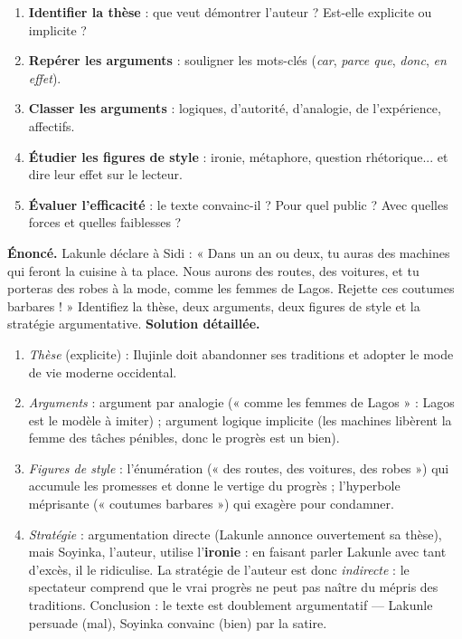 \documentclass[11pt]{article}
\begin{document}
\begin{methode}
\begin{enumerate}
\item \textbf{Identifier la thèse} : que veut démontrer l'auteur ? Est-elle explicite ou implicite ?
\item \textbf{Repérer les arguments} : souligner les mots-clés (\emph{car}, \emph{parce que}, \emph{donc}, \emph{en effet}).
\item \textbf{Classer les arguments} : logiques, d'autorité, d'analogie, de l'expérience, affectifs.
\item \textbf{Étudier les figures de style} : ironie, métaphore, question rhétorique... et dire leur effet sur le lecteur.
\item \textbf{Évaluer l'efficacité} : le texte convainc-il ? Pour quel public ? Avec quelles forces et quelles faiblesses ?
\end{enumerate}
\end{methode}

\begin{exoresolu}
\textbf{Énoncé.} Lakunle déclare à Sidi : « Dans un an ou deux, tu auras des machines qui feront la cuisine à ta place. Nous aurons des routes, des voitures, et tu porteras des robes à la mode, comme les femmes de Lagos. Rejette ces coutumes barbares ! » Identifiez la thèse, deux arguments, deux figures de style et la stratégie argumentative.
\tcblower
\textbf{Solution détaillée.}
\begin{enumerate}
\item \emph{Thèse} (explicite) : Ilujinle doit abandonner ses traditions et adopter le mode de vie moderne occidental.
\item \emph{Arguments} : argument par analogie (« comme les femmes de Lagos » : Lagos est le modèle à imiter) ; argument logique implicite (les machines libèrent la femme des tâches pénibles, donc le progrès est un bien).
\item \emph{Figures de style} : l'énumération (« des routes, des voitures, des robes ») qui accumule les promesses et donne le vertige du progrès ; l'hyperbole méprisante (« coutumes barbares ») qui exagère pour condamner.
\item \emph{Stratégie} : argumentation directe (Lakunle annonce ouvertement sa thèse), mais Soyinka, l'auteur, utilise l'\textbf{ironie} : en faisant parler Lakunle avec tant d'excès, il le ridiculise. La stratégie de l'auteur est donc \emph{indirecte} : le spectateur comprend que le vrai progrès ne peut pas naître du mépris des traditions. Conclusion : le texte est doublement argumentatif — Lakunle persuade (mal), Soyinka convainc (bien) par la satire.
\end{enumerate}
\end{exoresolu}
\end{document}
